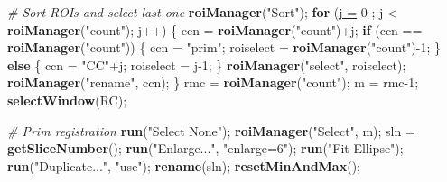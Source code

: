 \documentclass[11pt,singlespacinge,twoside]{reedthesis} %
\newenvironment{Shaded}{}{}
\newcommand{\CommentTok}[1]{\textit{#1}}
\newcommand{\ControlFlowTok}[1]{\textbf{#1}}
\newcommand{\DataTypeTok}[1]{\underline{#1}}
\newcommand{\DecValTok}[1]{#1}
\newcommand{\KeywordTok}[1]{\textbf{#1}}
\newcommand{\NormalTok}[1]{#1}
\newcommand{\OperatorTok}[1]{#1}
\newcommand{\StringTok}[1]{#1}
\theoremstyle{definition}
\theoremstyle{definition}
\theoremstyle{definition}
\theoremstyle{remark}
\begin{document}
\begin{Shaded}
\begin{Highlighting}[numbers=left,,]
    \CommentTok{# Sort ROIs and select last one}
        \KeywordTok{roiManager}\NormalTok{(}\StringTok{"Sort"}\NormalTok{);}
        \ControlFlowTok{for}\NormalTok{ (}\DataTypeTok{j =} \DecValTok{0}\NormalTok{ ; j }\OperatorTok{<}\StringTok{ }\KeywordTok{roiManager}\NormalTok{(}\StringTok{"count"}\NormalTok{); j}\OperatorTok{++}\NormalTok{) \{}
\NormalTok{            ccn =}\StringTok{ }\KeywordTok{roiManager}\NormalTok{(}\StringTok{"count"}\NormalTok{)}\OperatorTok{+}\NormalTok{j;}
            \ControlFlowTok{if}\NormalTok{ (ccn }\OperatorTok{==}\StringTok{ }\KeywordTok{roiManager}\NormalTok{(}\StringTok{"count"}\NormalTok{)) \{}
\NormalTok{                ccn =}\StringTok{ "prim"}\NormalTok{;}
\NormalTok{                roiselect =}\StringTok{ }\KeywordTok{roiManager}\NormalTok{(}\StringTok{"count"}\NormalTok{)}\OperatorTok{-}\DecValTok{1}\NormalTok{;}
\NormalTok{            \} }\ControlFlowTok{else}\NormalTok{ \{}
\NormalTok{                ccn =}\StringTok{ "CC"}\OperatorTok{+}\NormalTok{j;}
\NormalTok{                roiselect =}\StringTok{ }\NormalTok{j}\DecValTok{-1}\NormalTok{;}
\NormalTok{            \}}
            \KeywordTok{roiManager}\NormalTok{(}\StringTok{"select"}\NormalTok{, roiselect);}
            \KeywordTok{roiManager}\NormalTok{(}\StringTok{"rename"}\NormalTok{, ccn);}
\NormalTok{        \}}
\NormalTok{        rmc =}\StringTok{ }\KeywordTok{roiManager}\NormalTok{(}\StringTok{"count"}\NormalTok{);}
\NormalTok{        m =}\StringTok{ }\NormalTok{rmc}\DecValTok{-1}\NormalTok{;}
        \KeywordTok{selectWindow}\NormalTok{(RC);}
        
  \CommentTok{# Prim registration}
        \KeywordTok{run}\NormalTok{(}\StringTok{"Select None"}\NormalTok{);}
        \KeywordTok{roiManager}\NormalTok{(}\StringTok{"Select"}\NormalTok{, m);}
\NormalTok{        sln =}\StringTok{ }\KeywordTok{getSliceNumber}\NormalTok{();}
        \KeywordTok{run}\NormalTok{(}\StringTok{"Enlarge..."}\NormalTok{, }\StringTok{"enlarge=6"}\NormalTok{);}
        \KeywordTok{run}\NormalTok{(}\StringTok{"Fit Ellipse"}\NormalTok{);}
        \KeywordTok{run}\NormalTok{(}\StringTok{"Duplicate..."}\NormalTok{, }\StringTok{"use"}\NormalTok{);}
        \KeywordTok{rename}\NormalTok{(sln);}
        \KeywordTok{resetMinAndMax}\NormalTok{();}
        

\end{Highlighting}
\end{Shaded}
\end{document}

